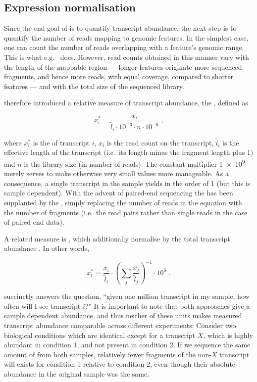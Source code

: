 \subsection{Expression normalisation}

Since the end goal of \rnaseq is to quantify transcript abundance, the next step
is to quantify the number of reads mapping to genomic features. In the simplest
case, one can count the number of reads overlapping with a feature’s genomic
range. This is what e.g.\  \citep{Anders:2014} does. However, read
counts obtained in this manner vary with the length of the mappable region ---
longer features originate more sequenced fragments, and hence more reads, with
equal coverage, compared to shorter features --- and with the total size of the
sequenced library.

\cite{Mortazavi:2008} therefore introduced a relative measure of transcript
abundance, the \rpkm, defined as

\begin{equation}
    x^*_i = \frac{x_i}{\tilde l_i \cdot 10^{-3} \cdot n \cdot 10^{-6}}
        \text{\ ,}
\end{equation}

where \(x^*_i\) is the \rpkm of transcript \(i\), \(x_i\) is the read count on
the transcript, \(\tilde l_i\) is the effective length of the transcript (i.e.\
its length minus the fragment length plus \num{1}) and \(n\) is the library size
(in number of reads). The constant multiplier \num{1e9} merely serves to make
otherwise very small values more manageable. As a consequence, a single
transcript in the sample yields in the order of \SI{1}{\rpkm} (but this is
sample dependent). With the advent of paired-end sequencing the \rpkm has been
supplanted by the \fpkm, simply replacing the number of reads in the equation
with the number of fragments (i.e.\ the read pairs rather than single reads in
the case of paired-end data).

A related measure is \tpm, which additionally normalise by the total transcript
abundance \citep{Li:2010}. In other words,

\begin{equation}
    x^*_i = \frac{x_i}{\tilde l_i} \cdot \left(\sum_j{\frac{x_j}{\tilde
        l_j}}\right)^{-1} \cdot 10^6 \text{\ .}
\end{equation}

\tpm succinctly answers the question, “given one million transcript in my
sample, how often will I see transcript \(i\)?” It is important to note that
both approaches give a sample dependent abundance, and thus neither of
these units makes measured transcript abundance comparable across different
experiments: Consider two biological conditions which are identical except for
a transcript \(X\), which is highly abundant in condition \num{1}, and not
present in condition \num{2}. If we sequence the same amount of \mrna from both
samples, relatively fewer fragments of the non-\(X\) transcript will exists for
condition \num{1} relative to condition \num{2}, even though their absolute
abundance in the original sample was the same.

